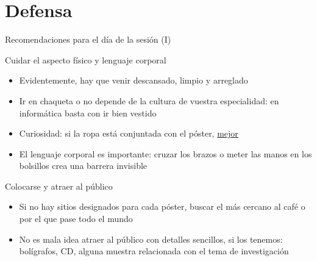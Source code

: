 \documentclass[xcolor=svgnames,compress]{beamer}
\begin{document}
\section{Defensa}

\begin{frame}{Recomendaciones para el día de la sesión (I)}

  \begin{block}{Cuidar el aspecto físico y lenguaje corporal}
    \begin{itemize}
    \item Evidentemente, hay que venir descansado, limpio y arreglado
    \item Ir en chaqueta o no depende de la cultura de vuestra
      especialidad: en informática basta con ir bien vestido
    \item Curiosidad: si la ropa está conjuntada con el póster,
      \href{http://www.cmaj.ca/content/169/12/1291.full}{mejor}
    \item El lenguaje corporal es importante: cruzar los brazos o
      meter las manos en los bolsillos crea una barrera invisible
    \end{itemize}
  \end{block}

  \begin{block}{Colocarse y atraer al público}
    \begin{itemize}
    \item Si no hay sitios designados para cada póster, buscar el más
      cercano al café o por el que pase todo el mundo
    \item No es mala idea atraer al público con detalles sencillos, si
      los tenemos: bolígrafos, CD, alguna muestra relacionada con el
      tema de investigación
    \end{itemize}
  \end{block}

\end{frame}
\end{document}
